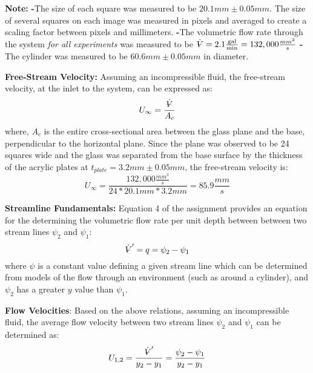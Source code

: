 \documentclass[12pt]{article}
\makeatletter
\DeclareRobustCommand{\volume}{\text{\volumedash}V}
\newcommand{\volumedash}{%
	\makebox[0pt][l]{%
		\ooalign{\hfil\hphantom{$\m@th V$}\hfil\cr\kern0.08em--\hfil\cr}%
	}%
}
\makeatother
\begin{document}
	\hfill\break\break
	\textbf{Note:} \hfill\break
	\textbf{-}The size of each square was measured to be $20.1mm\pm0.05mm$. The size of several squares on each image was measured in pixels and averaged to create a scaling factor between pixels and millimeters.
	\hfill\break
	\textbf{-}The volumetric flow rate through the system \textit{for all experiments} was measured to be $\dot{\volume}=2.1 \frac{\textrm{gal}}{\textrm{min}}=132,000 \frac{mm^{3}}{s}$
	\hfill\break
	\textbf{-}The cylinder was measured to be $60.6mm\pm0.05mm$ in diameter.
	
	\hfill\break\break
	\textbf{Free-Stream Velocity:}
	Assuming an incompressible fluid, the free-stream velocity, at the inlet to the system, can be expressed as:
	$$U_{\infty}=\frac{\dot{\volume}}{A_{c}}$$
	where, ${A_{c}}$ is the entire cross-sectional area between the glass plane and the base, perpendicular to the horizontal plane. \hfill\break
	Since the plane was observed to be 24 squares wide and the glass was separated from the base surface by the thickness of the acrylic plates at $t_{plate}=3.2mm\pm0.05mm$, the free-stream velocity is:
	$$U_{\infty}=\frac{132,000\frac{mm^{3}}{s}}{24*20.1mm * 3.2mm}=85.9\frac{mm}{s}$$
	
	\hfill\break\break
	\textbf{Streamline Fundamentals:}
	Equation 4 of the assignment provides an equation for the determining the volumetric flow rate per unit depth between between two stream lines $\psi_{2}$ and $\psi_{1}$:
	$$\dot{\volume}'=q=\psi_{2}-\psi_{1}$$
	where $\psi$ is a constant value defining a given stream line which can be determined from models of the flow through an environment (such as around a cylinder), and $\psi_{2}$ has a greater $y$ value than $\psi_{1}$.
	
	\hfill\break\break
	\textbf{Flow Velocities}:
	Based on the above relations, assuming an incompressible fluid, the average flow velocity between two stream lines $\psi_{2}$ and $\psi_{1}$ can be determined as:
	$$U_{1,2}= \frac{\dot{\volume}'}{y_2-y_1}=\frac{\psi_{2}-\psi_{1}}{y_2-y_1}$$
	
\end{document}
